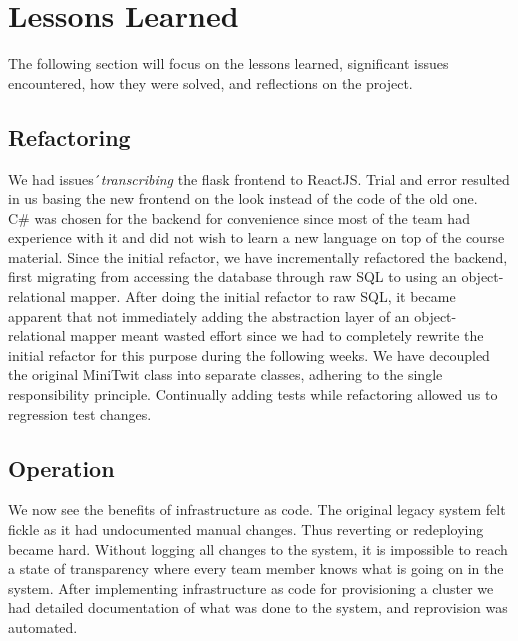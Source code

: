 \section{Lessons Learned}
\label{sec:lessons_learned}
The following section will focus on the lessons learned, significant issues encountered, how they were solved, and reflections on the project.
\subsection{Refactoring}
We had issues´\textit{transcribing} the flask frontend to ReactJS. Trial and error resulted in us basing the new frontend on the look instead of the code of the old one.\\
C\# was chosen for the backend for convenience since most of the team had experience with it and did not wish to learn a new language on top of the course material.
Since the initial refactor, we have incrementally refactored the backend, first migrating from accessing the database through raw SQL to using an object-relational mapper. After doing the initial refactor to raw SQL, it became apparent that not immediately adding the abstraction layer of an object-relational mapper meant wasted effort since we had to completely rewrite the initial refactor for this purpose during the following weeks.
We have decoupled the original MiniTwit class into separate classes, adhering to the single responsibility principle. Continually adding tests while refactoring allowed us to regression test changes.


\subsection{Operation}
We now see the benefits of infrastructure as code. The original legacy system felt fickle as it had undocumented manual changes. Thus reverting or redeploying became hard. Without logging all changes to the system, it is impossible to reach a state of transparency where every team member knows what is going on in the system. After implementing infrastructure as code for provisioning a cluster\cite{opsIssue5} we had detailed documentation of what was done to the system, and reprovision was automated.
